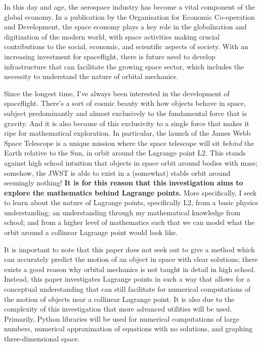 In this day and age, the aerospace industry has become a vital component of the global economy.
In a publication by the Organisation for Economic Co-operation and Development, the space economy plays a key role in the globalization and digitization of the modern world, with space activities making crucial contributions to the social, economic, and scientific aspects of society\autocite{c5996201-en}.
With an increasing investment for spaceflight, there is future need to develop infrastructure that can facilitate the growing space sector, which includes the necessity to understand the nature of orbital mechanics.

Since the longest time, I've always been interested in the development of spaceflight.
There's a sort of cosmic beauty with how objects behave in space, subject predominantly and almost exclusively to the fundamental force that is gravity.
And it is also because of this exclusivity to a single force that makes it ripe for mathematical exploration.
In particular, the launch of the James Webb Space Telescope is a unique mission where the space telescope will sit \textit{behind} the Earth relative to the Sun, in orbit around the Lagrange point L2.
This stands against high school intuition that objects in space orbit around bodies with mass; somehow, the JWST is able to exist in a (somewhat) stable orbit around seemingly nothing!
\textbf{It is for this reason that this investigation aims to explore the mathematics behind Lagrange points.}
More specifically, I seek to learn about the nature of Lagrange points, specifically L2, from a basic physics understanding; an understanding through my mathematical knowledge from school; and from a higher level of mathematics such that we can model what the orbit around a collinear Lagrange point would look like.

It is important to note that this paper does not seek out to give a method which can accurately predict the motion of an object in space with clear solutions; there exists a good reason why orbital mechanics is not taught in detail in high school.
Instead, this paper investigates Lagrange points in such a way that allows for a conceptual understanding that can still facilitate for numerical computations of the motion of objects near a collinear Lagrange point.
It is also due to the complexity of this investigation that more advanced utilities will be used.
Primarily, Python libraries will be used for numerical computations of large numbers, numerical approximation of equations with no solutions, and graphing three-dimensional space.